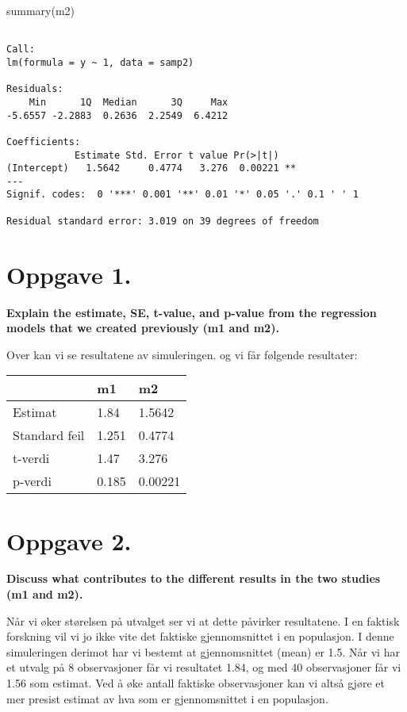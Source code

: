 \documentclass[
  letterpaper,
  DIV=11,
  numbers=noendperiod]{scrreprt}
\newenvironment{Shaded}{\begin{snugshade}}{\end{snugshade}}
\newcommand{\FunctionTok}[1]{\textcolor[rgb]{0.28,0.35,0.67}{#1}}
\newcommand{\NormalTok}[1]{\textcolor[rgb]{0.00,0.23,0.31}{#1}}
\begin{document}
\begin{Shaded}
\begin{Highlighting}[]
\FunctionTok{summary}\NormalTok{(m2)}
\end{Highlighting}
\end{Shaded}

\begin{verbatim}

Call:
lm(formula = y ~ 1, data = samp2)

Residuals:
    Min      1Q  Median      3Q     Max 
-5.6557 -2.2883  0.2636  2.2549  6.4212 

Coefficients:
            Estimate Std. Error t value Pr(>|t|)   
(Intercept)   1.5642     0.4774   3.276  0.00221 **
---
Signif. codes:  0 '***' 0.001 '**' 0.01 '*' 0.05 '.' 0.1 ' ' 1

Residual standard error: 3.019 on 39 degrees of freedom
\end{verbatim}

\section{Oppgave 1.}\label{oppgave-1.}

\textbf{Explain the estimate, SE, t-value, and p-value from the
regression models that we created previously (m1 and m2).}

Over kan vi se resultatene av simuleringen. og vi får følgende
resultater:

\begin{longtable}[]{@{}lll@{}}
\toprule\noalign{}
& m1 & m2 \\
\midrule\noalign{}
\endhead
\bottomrule\noalign{}
\endlastfoot
Estimat & 1.84 & 1.5642 \\
Standard feil & 1.251 & 0.4774 \\
t-verdi & 1.47 & 3.276 \\
p-verdi & 0.185 & 0.00221 \\
\end{longtable}

\section{Oppgave 2.}\label{oppgave-2.}

\textbf{Discuss what contributes to the different results in the two
studies (m1 and m2).}

Når vi øker størelsen på utvalget ser vi at dette påvirker resultatene.
I en faktisk forskning vil vi jo ikke vite det faktiske gjennomsnittet i
en populasjon. I denne simuleringen derimot har vi bestemt at
gjennomsnittet (mean) er 1.5. Når vi har et utvalg på 8 observasjoner
får vi resultatet 1.84, og med 40 observasjoner får vi 1.56 som estimat.
Ved å øke antall faktiske observasjoner kan vi altså gjøre et mer
presist estimat av hva som er gjennomsnittet i en populasjon.
\end{document}

